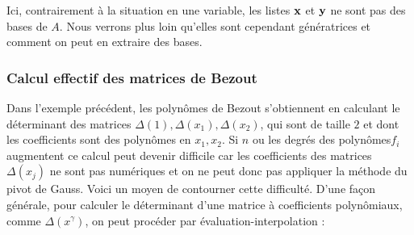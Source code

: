 \documentclass{standalone}
\begin{document}
\begin{exmp}
  \end{exmp}
  \begin{rem}
  Ici, contrairement à la situation en une variable, les listes $\bold{x}$ et $\bold{y}$ ne sont pas des bases de $A$. Nous verrons plus loin qu'elles sont cependant génératrices et comment on peut en extraire des bases.
  \end{rem}
  \subsubsection{Calcul effectif des matrices de Bezout}
  Dans l'exemple précédent, les polynômes de Bezout s'obtiennent en calculant le déterminant des matrices $\Delta(1), \Delta(x_1), \Delta(x_2)$, qui sont de taille $2$ et dont les coefficients sont des polynômes en $x_1, x_2$. Si $n$ ou les degrés des polynômes$f_i$ augmentent ce calcul peut devenir difficile car les coefficients des matrices $\Delta(x_j)$ ne sont pas numériques et on ne peut donc pas appliquer la méthode du pivot de Gauss. Voici un moyen de contourner cette difficulté. D'une façon générale, pour calculer le déterminant d'une matrice à coefficients polynômiaux, comme $\Delta(x^\gamma)$, on peut procéder par évaluation-interpolation :
\end{document}
